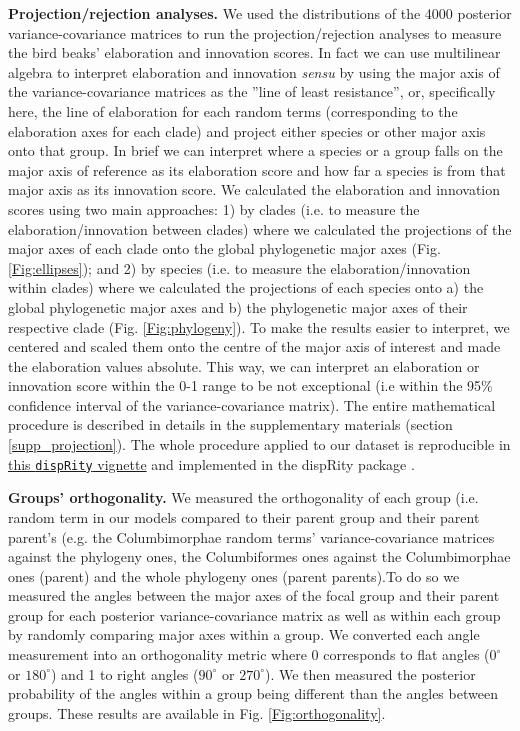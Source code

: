 \documentclass[12pt,letterpaper]{article}
\begin{document}
\textbf{Projection/rejection analyses.}
We used the distributions of the 4000 posterior variance-covariance matrices to run the projection/rejection analyses to measure the bird beaks' elaboration and innovation scores.
In fact we can use multilinear algebra to interpret elaboration and innovation \textit{sensu} \cite{endler2005animal} by using the major axis of the variance-covariance matrices as the ''line of least resistance'', or, specifically here, the line of elaboration for each random terms (corresponding to the elaboration axes for each clade) and project either species or other major axis onto that group.
In brief we can interpret where a species or a group falls on the major axis of reference as its elaboration score and how far a species is from that major axis as its innovation score.
We calculated the elaboration and innovation scores using two main approaches:
1) by clades (i.e. to measure the elaboration/innovation between clades) where we calculated the projections of the major axes of each clade onto the global phylogenetic major axes (Fig. \ref{Fig:ellipses});
and 2) by species (i.e. to measure the elaboration/innovation within clades) where we calculated the projections of each species onto a) the global phylogenetic major axes and b) the phylogenetic major axes of their respective clade (Fig. \ref{Fig:phylogeny}).
To make the results easier to interpret, we centered and scaled them onto the centre of the major axis of interest and made the elaboration values absolute.
This way, we can interpret an elaboration or innovation score within the 0-1 range to be not exceptional (i.e within the 95\% confidence interval of the variance-covariance matrix).
The entire mathematical procedure is described in details in the supplementary materials (section \ref{supp_projection}).
The whole procedure applied to our dataset is reproducible in \href{https://raw.rawgit.net/TGuillerme/dispRity/master/inst/vignettes/Projection_analysis.html}{this \texttt{dispRity} vignette} %
and implemented in the dispRity package \cite{dispRity}.

\textbf{Groups' orthogonality.}
We measured the orthogonality of each group (i.e. random term in our models compared to their parent group and their parent parent's (e.g.
the Columbimorphae random terms' variance-covariance matrices against the phylogeny ones, the Columbiformes ones against the Columbimorphae ones (parent) and the whole phylogeny ones (parent parents).To do so we measured the angles between the major axes of the focal group and their parent group for each posterior variance-covariance matrix as well as within each group by randomly comparing major axes within a group.
We converted each angle measurement into an orthogonality metric where 0 corresponds to flat angles ($0^\circ$ or  $180^\circ$) and 1 to right angles ($90^\circ$ or $270^\circ$).
We then measured the posterior probability of the angles within a group being different than the angles between groups.
These results are available in Fig. \ref{Fig:orthogonality}.
\end{document}

